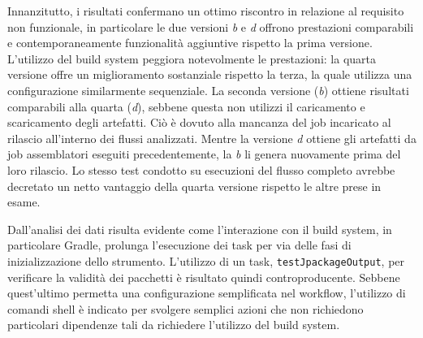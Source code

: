 Innanzitutto, i risultati confermano un ottimo riscontro in relazione al requisito non funzionale, in particolare le due versioni \textit{b} e \textit{d} offrono prestazioni comparabili e contemporaneamente funzionalità aggiuntive rispetto la prima versione. L'utilizzo del build system peggiora notevolmente le prestazioni: la quarta versione offre un miglioramento sostanziale rispetto la terza, la quale utilizza una configurazione similarmente sequenziale. La seconda versione (\textit{b}) ottiene risultati comparabili alla quarta (\textit{d}), sebbene questa non utilizzi il caricamento e scaricamento degli artefatti. Ciò è dovuto alla mancanza del job incaricato al rilascio all'interno dei flussi analizzati. Mentre la versione \textit{d} ottiene gli artefatti da job assemblatori eseguiti precedentemente, la \textit{b} li genera nuovamente prima del loro rilascio. Lo stesso test condotto su esecuzioni del flusso completo avrebbe decretato un netto vantaggio della quarta versione rispetto le altre prese in esame.

Dall'analisi dei dati risulta evidente come l'interazione con il build system, in particolare Gradle, prolunga l'esecuzione dei task per via delle fasi di inizializzazione dello strumento. L'utilizzo di un task, \texttt{testJpackageOutput}, per verificare la validità dei pacchetti è risultato quindi controproducente. Sebbene quest'ultimo permetta una configurazione semplificata nel workflow, l'utilizzo di comandi shell è indicato per svolgere semplici azioni che non richiedono particolari dipendenze tali da richiedere l'utilizzo del build system.